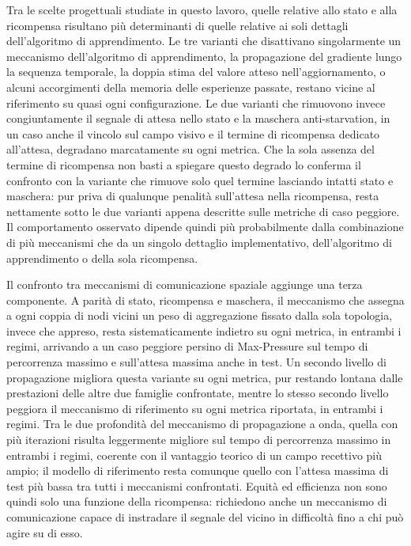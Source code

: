Tra le scelte progettuali studiate in questo lavoro, quelle relative allo
stato e alla ricompensa risultano più determinanti di quelle relative ai
soli dettagli dell'algoritmo di apprendimento. Le tre varianti che
disattivano singolarmente un meccanismo dell'algoritmo di apprendimento,
la propagazione del gradiente lungo la sequenza temporale, la doppia
stima del valore atteso nell'aggiornamento, o alcuni accorgimenti della
memoria delle esperienze passate, restano vicine al riferimento su quasi
ogni configurazione. Le due varianti che rimuovono invece congiuntamente
il segnale di attesa nello stato e la maschera anti-starvation, in un
caso anche il vincolo sul campo visivo e il termine di ricompensa
dedicato all'attesa, degradano marcatamente su ogni metrica. Che la sola
assenza del termine di ricompensa non basti a spiegare questo degrado lo
conferma il confronto con la variante che rimuove solo quel termine
lasciando intatti stato e maschera: pur priva di qualunque penalità
sull'attesa nella ricompensa, resta nettamente sotto le due varianti
appena descritte sulle metriche di caso peggiore. Il comportamento
osservato dipende quindi più probabilmente dalla combinazione di più
meccanismi che da un singolo dettaglio implementativo, dell'algoritmo di
apprendimento o della sola ricompensa.

Il confronto tra meccanismi di comunicazione spaziale aggiunge una terza
componente. A parità di stato, ricompensa e maschera, il meccanismo che
assegna a ogni coppia di nodi vicini un peso di aggregazione fissato
dalla sola topologia, invece che appreso, resta sistematicamente indietro
su ogni metrica, in entrambi i regimi, arrivando a un caso peggiore
persino di Max-Pressure sul tempo di percorrenza massimo e sull'attesa
massima anche in test. Un secondo livello di
propagazione migliora questa variante su ogni metrica, pur restando
lontana dalle prestazioni delle altre due famiglie confrontate, mentre lo
stesso secondo livello peggiora il meccanismo di riferimento su ogni
metrica riportata, in entrambi i regimi. Tra le due profondità del
meccanismo di propagazione a onda, quella con più iterazioni risulta
leggermente migliore sul tempo di percorrenza massimo in entrambi i
regimi, coerente con il vantaggio teorico di un campo recettivo più
ampio; il modello di riferimento resta comunque quello con l'attesa
massima di test più bassa tra tutti i meccanismi confrontati. Equità ed
efficienza non sono quindi solo una funzione della ricompensa: richiedono
anche un meccanismo di comunicazione capace di instradare il segnale del
vicino in difficoltà fino a chi può agire su di esso.

